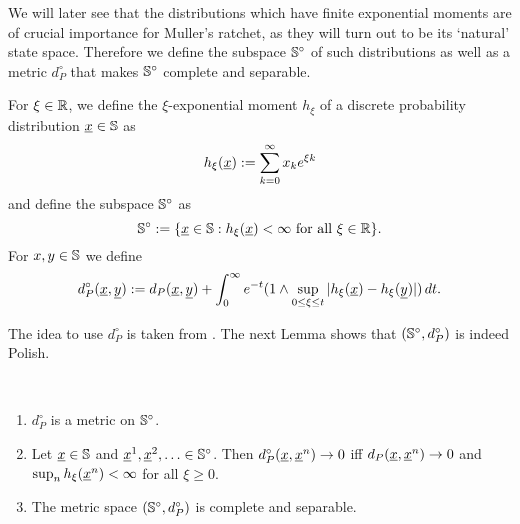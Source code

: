 \noindent
We will later see that the distributions which have finite exponential moments
are of crucial importance for Muller's ratchet, as they will turn out
to be its `natural' state space.
Therefore we define the subspace $\mathbb{S}^\circ$ of such distributions as well as a
metric $d_P^\circ$ that makes $\mathbb{S}^\circ$ complete and separable.

\begin{Definition}
For $\xi \in \mathbb{R}$, we define the $\xi$-exponential moment $h_\xi$ of a discrete probability
distribution $\underline{x} \in \mathbb{S}$ as 
\[ h_\xi( \underline{x} ) := \sum_{k=0}^\infty x_k e^{\xi k}\] 
and define the subspace $\mathbb{S}^\circ$ as
\[ 
\mathbb{S}^\circ 
:= \{ \underline{x} \in \mathbb{S} : h_\xi(\underline{x}) < \infty \text{ for all } \xi \in \mathbb{R}\}.
\]
For $x,y \in \mathbb{S}$ we define 
\begin{align} \label{pre:eq:defdcirc}
d_P^\circ(\underline{x},\underline{y}) 
 := 	d_P(\underline{x},\underline{y}) 
 +		\int_0^\infty e^{-t} (1 \wedge \sup_{0 \leq \xi \leq t} 
 			|h_\xi(\underline{x}) - h_\xi(\underline{y})|) \, dt.
\end{align}
\end{Definition}  

\noindent
The idea to use $d_P^\circ$ is taken from \citet{ethier_fleming-viot_2000}. The next Lemma
shows that $(\mathbb{S}^\circ, d_P^\circ)$ is indeed Polish.

\begin{Lemma}{\ } \label{pre:l:poln} 
\begin{enumerate}
\item $d_P^\circ$ is a metric on $\mathbb{S}^\circ$.
\item Let $\underline{x} \in \mathbb{S}$ and $\underline{x}^1,\underline{x}^2,\ldots \in
\mathbb{S}^\circ$. Then $d_P^\circ(\underline{x},\underline{x}^n) \to 0$ iff $d_P(\underline{x},\underline{x}^n) \to 0$ and $\sup_n
h_\xi(\underline{x}^n) < \infty$ for all $\xi \geq 0$.
\item The metric space $(\mathbb{S}^\circ, d_P^\circ)$ is complete and separable.
\end{enumerate}
\end{Lemma}

